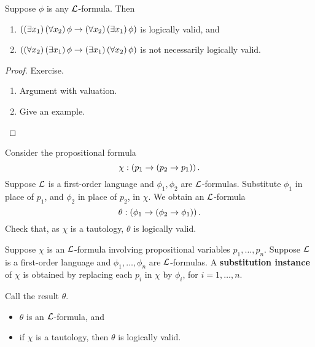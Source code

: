 \pagebreak

\begin{example}
Suppose $ \phi $ is any $ \mathcal{L} $-formula. Then
\begin{enumerate}
\item $ \left( \left( \exists x_1 \right)\left( \forall x_2 \right)\phi \rightarrow \left( \forall x_2 \right)\left( \exists x_1 \right)\phi \right) $ is logically valid, and
\item $ \left( \left( \forall x_2 \right)\left( \exists x_1 \right)\phi \rightarrow \left( \exists x_1 \right)\left( \forall x_2 \right)\phi \right) $ is not necessarily logically valid.
\end{enumerate}
\end{example}

\begin{proof}
Exercise.
\begin{enumerate}
\item Argument with valuation.
\item Give an example.
\end{enumerate}
\end{proof}

\begin{example*}
Consider the propositional formula
$$ \chi : \left( p_1 \rightarrow \left( p_2 \rightarrow p_1 \right) \right). $$
Suppose $ \mathcal{L} $ is a first-order language and $ \phi_1, \phi_2 $ are $ \mathcal{L} $-formulas. Substitute $ \phi_1 $ in place of $ p_1 $, and $ \phi_2 $ in place of $ p_2 $, in $ \chi $. We obtain an $ \mathcal{L} $-formula
$$ \theta : \left( \phi_1 \rightarrow \left( \phi_2 \rightarrow \phi_1 \right) \right). $$
Check that, as $ \chi $ is a tautology, $ \theta $ is logically valid.
\end{example*}

\begin{definition}
Suppose $ \chi $ is an $ \mathcal{L} $-formula involving propositional variables $ p_1, \dots, p_n $. Suppose $ \mathcal{L} $ is a first-order language and $ \phi_1, \dots, \phi_n $ are $ \mathcal{L} $-formulas. A \textbf{substitution instance} of $ \chi $ is obtained by replacing each $ p_i $ in $ \chi $ by $ \phi_i $, for $ i = 1, \dots, n $.
\end{definition}

Call the result $ \theta $.

\begin{theorem}
\hfill
\begin{itemize}
\item $ \theta $ is an $ \mathcal{L} $-formula, and
\item if $ \chi $ is a tautology, then $ \theta $ is logically valid.
\end{itemize}
\end{theorem}


